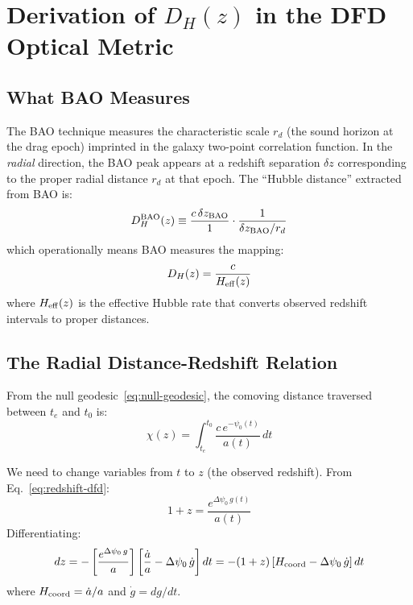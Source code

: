 \documentclass[11pt,a4paper]{article}
\begin{document}
\section{Derivation of $D_H(z)$ in the DFD Optical Metric}
\label{sec:DH-derivation}

\subsection{What BAO Measures}

The BAO technique measures the characteristic scale $r_d$ (the sound
horizon at the drag epoch) imprinted in the galaxy two-point correlation
function. In the \emph{radial} direction, the BAO peak appears at a
redshift separation $\delta z$ corresponding to the proper radial
distance $r_d$ at that epoch. The ``Hubble distance'' extracted from
BAO is:
\begin{equation}
D_H^{\rm BAO}(z) \equiv \frac{c\,\delta z_{\rm BAO}}{1} \cdot \frac{1}{\delta z_{\rm BAO}/r_d}
\end{equation}
which operationally means BAO measures the mapping:
\begin{equation}
D_H(z) = \frac{c}{H_{\rm eff}(z)}
\end{equation}
where $H_{\rm eff}(z)$ is the effective Hubble rate that converts
observed redshift intervals to proper distances.

\subsection{The Radial Distance-Redshift Relation}

From the null geodesic~\eqref{eq:null-geodesic}, the comoving distance
traversed between $t_e$ and $t_0$ is:
\begin{equation}
\chi(z) = \int_{t_e}^{t_0} \frac{c\,e^{-\psi_0(t)}}{a(t)}\,dt
\label{eq:chi-integral}
\end{equation}

We need to change variables from $t$ to $z$ (the observed redshift).
From Eq.~\eqref{eq:redshift-dfd}:
\begin{equation}
1 + z = \frac{e^{\Delta\psi_0\,g(t)}}{a(t)}
\end{equation}
Differentiating:
\begin{equation}
dz = -\left[\frac{e^{\Delta\psi_0\,g}}{a}\right]
\left[\frac{\dot{a}}{a} - \Delta\psi_0\,\dot{g}\right]dt
= -(1+z)\left[H_{\rm coord} - \Delta\psi_0\,\dot{g}\right]dt
\end{equation}
where $H_{\rm coord} = \dot{a}/a$ and $\dot{g} = dg/dt$.
\end{document}
